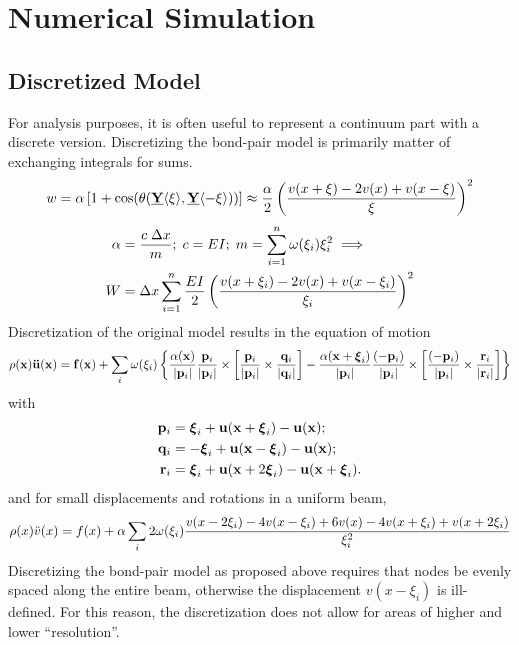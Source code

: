 \documentclass[11pt]{amsart}
\newcommand\vstate[3]{%
	\mathbf{\underline{#1}}%
	\ifstrempty{#2}{}{[#2]}%
	\ifstrempty{#3}{}{\langle #3 \rangle}}
\begin{document}
\section{Numerical Simulation}
\label{sec:Numerical}
\subsection{Discretized Model}
\label{sec:Discretized}
For analysis purposes, it is often useful to represent a continuum part with a discrete version. 
Discretizing the bond-pair model is primarily matter of exchanging integrals for sums. 
%
\begin{align}
w = \alpha \left[1+\cos(\theta(\vstate{Y}{}{\xi},\vstate{Y}{}{\mathbf{-\xi}})) \right] \approx \frac{\alpha}{2}\left(\frac{v(x+\xi)-2v(x)+v(x-\xi)}{\xi}\right)^2 \notag
\end{align}
%
\begin{align}
\label{eq:discretebeam}
\alpha &= \frac{c\; \Delta x}{m} ;\; c= EI ;\; m=\sum_{i=1}^n \omega(\xi_i)\xi_i^2 \implies \nonumber \\
W&=\Delta x \sum_{i=1}^n \frac{EI}{2}\left(\frac{v(x+\xi_i)-2v(x)+v(x-\xi_i)}{\xi_i}\right)^2\notag
\end{align}
%
Discretization of the original model results in the equation of motion
\begin{equation}
\rho(\mathbf{x})\mathbf{\ddot{u}}(\mathbf{x}) = \mathbf{f}(\mathbf{x})+\sum_i \omega(\xi_i)\left\{\frac{\alpha(\mathbf{x})}{|\mathbf{p}_i |}\frac{\mathbf{p}_i}{|\mathbf{p}_i |}\times\left[\frac{\mathbf{p}_i}{|\mathbf{p}_i |}\times \frac{\mathbf{q}_i}{|\mathbf{q}_i |}\right]-\frac{\alpha(\mathbf{x}+\boldsymbol{\xi}_i)}{|\mathbf{p}_i |}\frac{(-\mathbf{p}_i)}{|\mathbf{p}_i |}\times\left[\frac{(-\mathbf{p}_i)}{|\mathbf{p}_i |}\times \frac{\mathbf{r}_i}{|\mathbf{r}_i |}\right]\right\}\notag
\end{equation}
with
\begin{align}
\mathbf{p}_i &= \boldsymbol{\xi}_i+\mathbf{u}(\mathbf{x}+\boldsymbol{\xi}_i)-\mathbf{u}(\mathbf{x});\notag\\
\mathbf{q}_i &= -\boldsymbol{\xi}_i+\mathbf{u}(\mathbf{x}-\boldsymbol{\xi}_i)-\mathbf{u}(\mathbf{x});\notag\\
\mathbf{r}_i &= \boldsymbol{\xi}_i+\mathbf{u}(\mathbf{x}+2\boldsymbol{\xi}_i)-\mathbf{u}(\mathbf{x}+\boldsymbol{\xi}_i).\notag
\end{align}
and for small displacements and rotations in a uniform beam,
\begin{equation}
\rho(x)\ddot{v}(x) = f(x)+\alpha \sum_i 2\omega(\xi_i)\frac{v(x-2\xi_i)-4v(x-\xi_i)+6v(x)-4v(x+\xi_i)+v(x+2\xi_i)}{\xi_i^2}\notag
\end{equation}
Discretizing the bond-pair model as proposed above requires that nodes be evenly spaced along the entire beam, otherwise the displacement \(v(x-\xi_i)\) is ill-defined. 
For this reason, the discretization does not allow for areas of higher and lower ``resolution''. 
%
\end{document}
